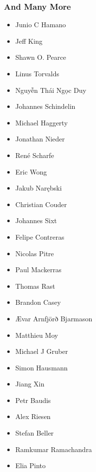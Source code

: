 \begin{frame}
    \frametitle{And Many More}
    {
        \fontsize{2.5}{4}\selectfont
        \setlength{\parskip}{3pt}
        \setlength{\parindent}{0pt}
        \color{black}
        \setlength{\columnsep}{0pt}
        \begin{multicols}{7}
            \begin{itemize}
                \item[] Junio C Hamano
                \item[] Jeff King
                \item[] Shawn O. Pearce
                \item[] Linus Torvalds
                \item[] Nguyễn Thái Ngọc Duy
                \item[] Johannes Schindelin
                \item[] Michael Haggerty
                \item[] Jonathan Nieder
                \item[] René Scharfe
                \item[] Eric Wong
                \item[] Jakub Narębski
                \item[] Christian Couder
                \item[] Johannes Sixt
                \item[] Felipe Contreras
                \item[] Nicolas Pitre
                \item[] Paul Mackerras
                \item[] Thomas Rast
                \item[] Brandon Casey
                \item[] Ævar Arnfjörð Bjarmason
                \item[] Matthieu Moy
                \item[] Michael J Gruber
                \item[] Simon Hausmann
                \item[] Jiang Xin
                \item[] Petr Baudis
                \item[] Alex Riesen
                \item[] Stefan Beller
                \item[] Ramkumar Ramachandra
                \item[] Elia Pinto

\end{itemize}
\end{multicols}}
\end{frame}
